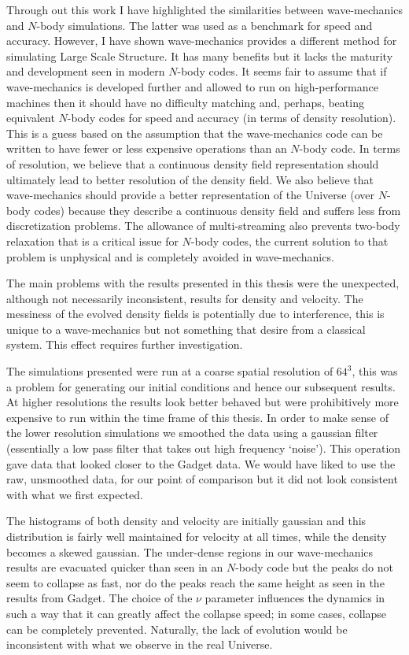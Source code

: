 Through out this work I have highlighted the similarities between wave-mechanics and $N$-body simulations. The latter was used as a benchmark for speed and accuracy. However, I have shown wave-mechanics provides a different method for simulating Large Scale Structure. It has many benefits but it lacks the maturity and development seen in modern $N$-body codes. It seems fair to assume that if wave-mechanics is developed further and allowed to run on high-performance machines then it should have no difficulty matching and, perhaps, beating equivalent $N$-body codes for speed and accuracy (in terms of density resolution). This is a guess based on the assumption that the wave-mechanics code can be written to have fewer or less expensive operations than an $N$-body code. In terms of resolution, we believe that a continuous density field representation should ultimately lead to better resolution of the density field. We also believe that wave-mechanics should provide a better representation of the Universe (over $N$-body codes) because they describe a continuous density field and suffers less from discretization problems. The allowance of multi-streaming also prevents two-body relaxation that is a critical issue for $N$-body codes, the current solution to that problem is unphysical and is completely avoided in wave-mechanics.

The main problems with the results presented in this thesis were the unexpected, although not necessarily inconsistent, results for density and velocity. The messiness of the evolved density fields is potentially due to interference, this is unique to a wave-mechanics but not something that desire from a classical system. This effect requires further investigation.

The simulations presented were run at a coarse spatial resolution of $64^3$, this was a problem for generating our initial conditions and hence our subsequent results. At higher resolutions the results look better behaved but were prohibitively more expensive to run within the time frame of this thesis. In order to make sense of the lower resolution simulations we smoothed the data using a gaussian filter (essentially a low pass filter that takes out high frequency `noise'). This operation gave data that looked closer to the Gadget data. We would have liked to use the raw, unsmoothed data, for our point of comparison but it did not look consistent with what we first expected.

The histograms of both density and velocity are initially gaussian and this distribution is fairly well maintained for velocity at all times, while the density becomes a skewed gaussian. The under-dense regions in our wave-mechanics results are evacuated quicker than seen in an $N$-body code but the peaks do not seem to collapse as fast, nor do the peaks reach the same height as seen in the results from Gadget. The choice of the $\nu$ parameter influences the dynamics in such a way that it can greatly affect the collapse speed; in some cases, collapse can be completely prevented. Naturally, the lack of evolution would be inconsistent with what we observe in the real Universe.

